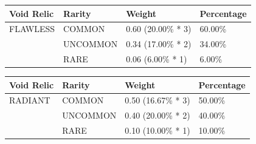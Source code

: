\documentclass[12pt]{article}
\begin{document}
\begin{center}
	\begin{tabular}{|l||l|l|l|}
		\hline
		Void Relic & Rarity   & Weight             & Percentage \\
		\hline
		FLAWLESS   & COMMON   & 0.60 (20.00\% * 3) & 60.00\%    \\
		           & UNCOMMON & 0.34 (17.00\% * 2) & 34.00\%    \\
		           & RARE     & 0.06 (6.00\% * 1)  & 6.00\%     \\
		\hline
	\end{tabular}
\end{center}

\begin{center}
	\begin{tabular}{|l||l|l|l|}
		\hline
		Void Relic & Rarity   & Weight             & Percentage \\
		\hline
		RADIANT    & COMMON   & 0.50 (16.67\% * 3) & 50.00\%    \\
		           & UNCOMMON & 0.40 (20.00\% * 2) & 40.00\%    \\
		           & RARE     & 0.10 (10.00\% * 1) & 10.00\%    \\
		\hline
	\end{tabular}
\end{center}
\end{document}
